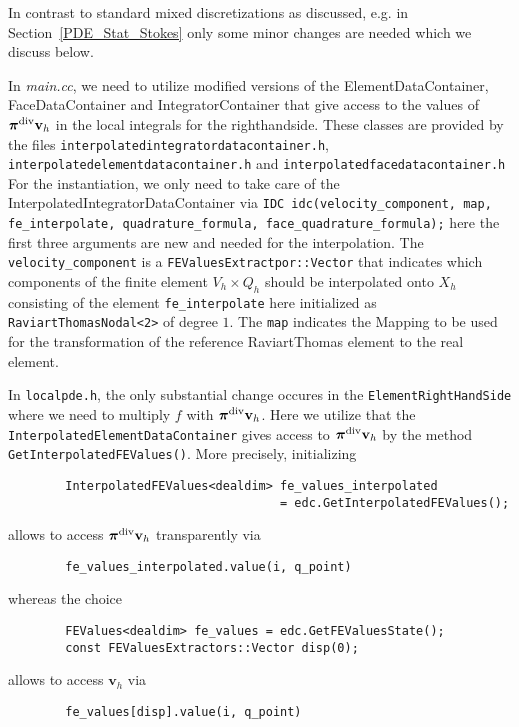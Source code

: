  In contrast to standard mixed discretizations as discussed, e.g. in Section~\ref{PDE_Stat_Stokes} only some minor changes are needed which we discuss below. 

In \textit{main.cc}, we need to utilize modified versions of the ElementDataContainer,
FaceDataContainer and IntegratorContainer that give access to the values of
$\bm{\pi}^{\rm{div}}\textbf{v}_h$ in the local integrals for the righthandside.  
These classes are provided by the files
\texttt{interpolatedintegratordatacontainer.h}, 
\texttt{interpolatedelementdatacontainer.h} and \texttt{interpolatedfacedatacontainer.h}
For the instantiation, we only need to take care of the InterpolatedIntegratorDataContainer
via
\texttt{IDC idc(velocity\_component, map, fe\_interpolate, quadrature\_formula, face\_quadrature\_formula);}
here the first three arguments are new and needed for the interpolation. The \texttt{velocity\_component} is a \texttt{FEValuesExtractpor::Vector} that indicates which components of the finite
element $V_h\times Q_h$ should be interpolated onto $X_h$ consisting of the element
\texttt{fe\_interpolate} here initialized as \texttt{RaviartThomasNodal<2>} of degree $1$.
The \texttt{map} indicates the Mapping to be used for the transformation of the reference
RaviartThomas element to the real element.

In \texttt{localpde.h}, the only substantial change occures in the
\texttt{ElementRightHandSide} where we need to multiply $f$ with
$\bm{\pi}^{\rm{div}} \textbf{v}_h$.
Here we utilize that the \texttt{InterpolatedElementDataContainer} gives access to $\bm{\pi}^{\rm{div}} \textbf{v}_h$ by the method \texttt{GetInterpolatedFEValues()}.
More precisely, initializing 
\begin{verbatim}
        InterpolatedFEValues<dealdim> fe_values_interpolated 
                                      = edc.GetInterpolatedFEValues();   
\end{verbatim}                
allows to access $\bm{\pi}^{\rm{div}} \textbf{v}_h$ transparently via
\begin{verbatim}
        fe_values_interpolated.value(i, q_point)
\end{verbatim}
whereas the choice 
\begin{verbatim}
        FEValues<dealdim> fe_values = edc.GetFEValuesState(); 
        const FEValuesExtractors::Vector disp(0);
\end{verbatim}                
allows to access $\textbf{v}_h$ via
\begin{verbatim}
        fe_values[disp].value(i, q_point)
\end{verbatim}

   


